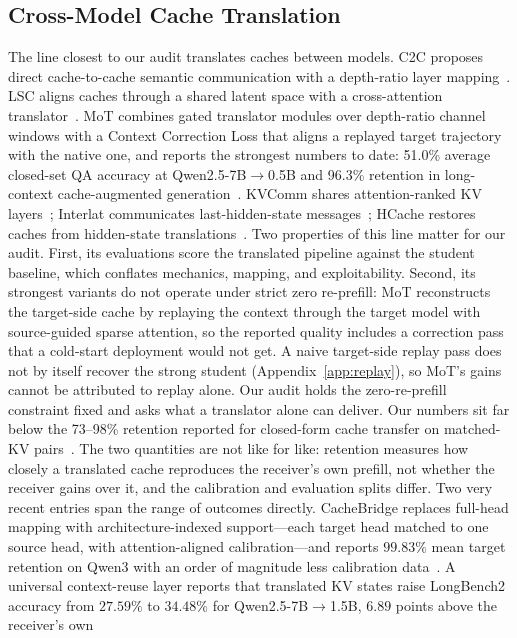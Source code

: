 \documentclass[10pt]{article}
\begin{document}
\subsection{Cross-Model Cache Translation}
The line closest to our audit translates caches between models. C2C proposes
direct cache-to-cache semantic communication with a depth-ratio layer
mapping~\citep{c2c2025}. LSC aligns caches through a shared latent space with
a cross-attention translator~\citep{lsc2026}. MoT combines gated translator
modules over depth-ratio channel windows with a Context Correction Loss that
aligns a replayed target trajectory with the native one, and reports the
strongest numbers to date: 51.0\% average closed-set QA accuracy at
Qwen2.5-7B$\to$0.5B and 96.3\% retention in long-context cache-augmented
generation~\citep{mot2026}. KVComm shares attention-ranked KV
layers~\citep{kvcomm2025}; Interlat communicates last-hidden-state
messages~\citep{interlat2025}; HCache restores caches from hidden-state
translations~\citep{hcache2025}. Two properties of this line matter for our
audit. First, its evaluations score the translated pipeline against the
student baseline, which conflates mechanics, mapping, and exploitability.
Second, its strongest variants do not operate under strict zero re-prefill:
MoT reconstructs the target-side cache by replaying the context through the
target model with source-guided sparse attention, so the reported quality
includes a correction pass that a cold-start deployment would not get. A naive
target-side replay pass does not by itself recover the strong student
(Appendix~\ref{app:replay}), so MoT's gains cannot be attributed to replay
alone. Our audit holds the zero-re-prefill constraint fixed and asks what a
translator alone can deliver. Our numbers sit far below the 73--98\% retention
reported for closed-form cache transfer on matched-KV
pairs~\citep{heo2026}. The two quantities are not like for like: retention
measures how closely a translated cache reproduces the receiver's own prefill,
not whether the receiver gains over it, and the calibration and evaluation
splits differ. Two very recent entries span the range of outcomes directly.
CacheBridge replaces full-head mapping with architecture-indexed support---each
target head matched to one source head, with attention-aligned calibration---and
reports $99.83\%$ mean target retention on Qwen3 with an order of magnitude
less calibration data~\citep{cachebridge2026}. A universal context-reuse layer
reports that translated KV states raise LongBench2 accuracy from $27.59\%$ to
$34.48\%$ for Qwen2.5-7B$\to$1.5B, $6.89$ points above the receiver's own
\end{document}
